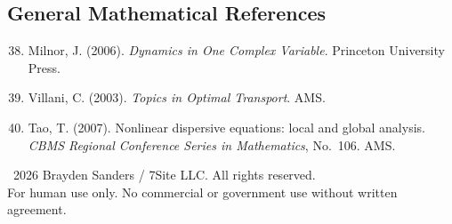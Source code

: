 \documentclass[12pt, openany]{book}
\theoremstyle{remark}
\begin{document}
\subsection*{General Mathematical References}

\begin{enumerate}\setcounter{enumi}{37}

\item Milnor, J. (2006). \emph{Dynamics in One Complex Variable}. Princeton
      University Press.

\item Villani, C. (2003). \emph{Topics in Optimal Transport}. AMS.

\item Tao, T. (2007). Nonlinear dispersive equations: local and global analysis.
      \emph{CBMS Regional Conference Series in Mathematics}, No.~106. AMS.

\end{enumerate}


\vfill
\begin{center}
\textcopyright\ 2026 Brayden Sanders / 7Site LLC. All rights reserved.\\
For human use only. No commercial or government use without written agreement.
\end{center}
\end{document}
